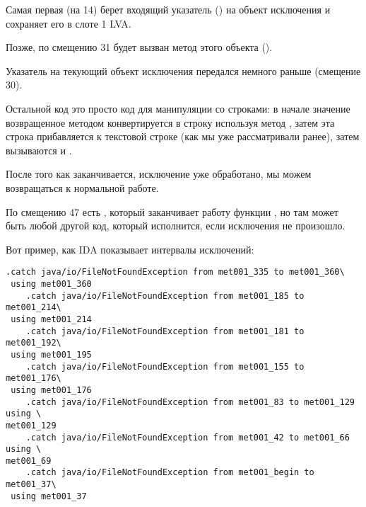 Самая первая  (на 14) берет входящий указатель () на объект 
исключения и сохраняет его в слоте 1 \ac{LVA}.

Позже, по смещению 31 будет вызван метод этого объекта ().

Указатель  на текующий объект исключения передался немного раньше (смещение 30).

Остальной код это просто код для манипуляции со строками: 
в начале значение возвращенное методом 
конвертируется в строку используя метод , 
затем эта строка прибавляется к текстовой строке
 (как мы уже рассматривали ранее),
затем вызываются  и .

После того как  заканчивается, исключение уже обработано, мы можем
возвращаться к нормальной работе.

По смещению 47 есть , который заканчивает работу функции \main, 
но там может быть любой другой код, который исполнится, если исключения не произошло.

Вот пример, как IDA показывает интервалы исключений:

\begin{lstlisting}[caption=из какого-то случайного найденного на компьютере автора .class-файла]
    .catch java/io/FileNotFoundException from met001_335 to met001_360\
 using met001_360
    .catch java/io/FileNotFoundException from met001_185 to met001_214\
 using met001_214
    .catch java/io/FileNotFoundException from met001_181 to met001_192\
 using met001_195
    .catch java/io/FileNotFoundException from met001_155 to met001_176\
 using met001_176
    .catch java/io/FileNotFoundException from met001_83 to met001_129 using \
met001_129
    .catch java/io/FileNotFoundException from met001_42 to met001_66 using \
met001_69
    .catch java/io/FileNotFoundException from met001_begin to met001_37\
 using met001_37
\end{lstlisting}

